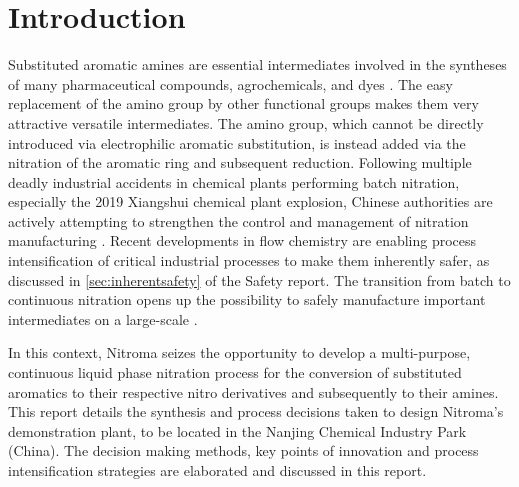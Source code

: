 \section{Introduction} %

Substituted aromatic amines are essential intermediates involved in the syntheses of many pharmaceutical compounds, agrochemicals, and dyes \cite{vogt_amines_2000}. The easy replacement of the amino group by other functional groups makes them very attractive versatile intermediates. The amino group, which cannot be directly introduced via electrophilic aromatic substitution, is instead added via the nitration of the aromatic ring and subsequent reduction.
Following multiple deadly industrial accidents in chemical plants performing batch nitration, especially the 2019 Xiangshui chemical plant explosion, Chinese authorities are actively attempting to strengthen the control and management of nitration manufacturing \cite{el_diario_china_2019}.
Recent developments in flow chemistry are enabling process intensification of critical industrial processes to make them inherently safer, as discussed in \cref{sec:inherentsafety} of the Safety report. The transition from batch to continuous nitration opens up the possibility to safely manufacture important intermediates on a large-scale \cite{di_miceli_raimondi_safety_2015}.

In this context, Nitroma seizes the opportunity to develop a multi-purpose, continuous liquid phase nitration process for the conversion of substituted aromatics to their respective nitro derivatives and subsequently to their amines.
This report details the synthesis and process decisions taken to design Nitroma’s demonstration plant, to be located in the Nanjing Chemical Industry Park (China). The decision making methods, key points of innovation and process intensification strategies are elaborated and discussed in this report.
